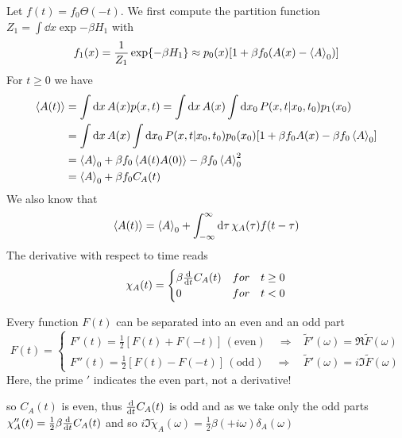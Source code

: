 \documentclass{notebook}
\begin{document}
Let $f(t) = f_0 \Theta(-t)$. We first compute the partition function $Z_1 = \int \dd{x} \exp{- \beta H_1}$ with 
%
\begin{equation}
	f_1(x) = \frac{1}{Z_1} \exp{- \beta H_1} \approx p_0(x) [1 + \beta f_0(A(x) - \expval{A}_0)]
\end{equation}
%
For $t \geq 0$ we have 
%
\begin{align*}
\expval{A(t)} &= \int \dd{x} A(x) p(x,t) = \int \dd{x} A(x) \int \dd{x_0} P(x, t | x_0, t_0) p_1(x_0) \\
&= \int \dd{x} A(x) \int \dd{x_0} P(x, t | x_0, t_0) p_0(x_0) [1 + \beta f_0 A(x) - \beta f_0  \expval{A}_0] \\
&= \expval{A}_0 + \beta f_0 \expval{A(t) A(0)} -\beta f_0 \expval{A}^2_0 \\
&= \expval{A}_0 + \beta f_0 C_A(t)
\end{align*}
%
We also know that
%
\begin{equation}
\expval{A(t)} = \expval{A}_0 + \int_{-\infty}^{\infty} \dd{\tau} \chi_A(\tau) f(t-\tau)
\end{equation}
%
The derivative with respect to time reads
%
\begin{equation*}
	\chi_A(t) = 
	\begin{cases} 
		\beta \dv{t} C_A(t) & for \quad t \geq 0 \\ 
		0 & for \quad t < 0
	\end{cases}
\end{equation*}
%

%
\begin{caveat}
	Every function $F(t)$ can be separated into an even and an odd part
	\begin{equation*}
	F(t) = 
	\begin{cases} 
	F'(t) = \frac{1}{2} [F(t) + F(-t)] \, (\mathrm{even}) \quad \Rightarrow & \tilde{F}'(\omega) = \Re \tilde{F}(\omega) \\ 
	F''(t) = \frac{1}{2} [F(t) - F(-t)] \, (\mathrm{odd}) \quad \Rightarrow & \tilde{F}'(\omega) = i \Im \tilde{F}(\omega)
	\end{cases}
	\end{equation*}
	Here, the prime $'$ indicates the even part, not a derivative!
\end{caveat}
%

so $C_A(t)$ is even, thus $\dv{t} C_A(t)$ is odd and as we take only the odd parts 
$\chi_A''(t) = \frac{1}{2} \beta \dv{t} C_A(t)$
and so $i \Im \tilde{\chi}_A(\omega) = \frac{1}{2} \beta (+ i \omega) \delta_A(\omega)$
\end{document}
